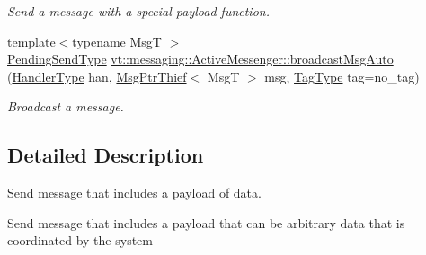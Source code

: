\begin{DoxyCompactItemize}
\begin{DoxyCompactList}\small\item\em Send a message with a special payload function. \end{DoxyCompactList}\item 
{\footnotesize template$<$typename MsgT $>$ }\\\hyperlink{structvt_1_1messaging_1_1_active_messenger_a3626a6ca76d8ad4ec7c3b47a2c70d3a8}{Pending\+Send\+Type} \hyperlink{group__sendpayload_gab11ebaa792d7b87397773347626ad4f9}{vt\+::messaging\+::\+Active\+Messenger\+::broadcast\+Msg\+Auto} (\hyperlink{namespacevt_af64846b57dfcaf104da3ef6967917573}{Handler\+Type} han, \hyperlink{structvt_1_1messaging_1_1_msg_ptr_thief}{Msg\+Ptr\+Thief}$<$ MsgT $>$ msg, \hyperlink{namespacevt_a84ab281dae04a52a4b243d6bf62d0e52}{Tag\+Type} tag=no\+\_\+tag)
\begin{DoxyCompactList}\small\item\em Broadcast a message. \end{DoxyCompactList}\end{DoxyCompactItemize}


\subsection{Detailed Description}
Send message that includes a payload of data. 

Send message that includes a payload that can be arbitrary data that is coordinated by the system


